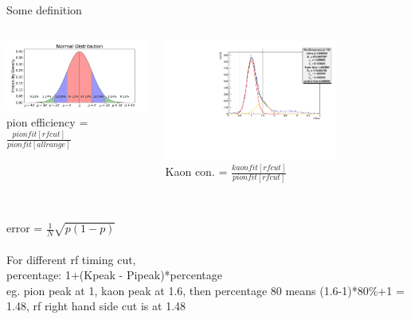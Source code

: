 \documentclass[aspectratio=169,xcolor=dvipsnames]{beamer}
\begin{document}
\begin{frame}{Some definition}
\begin{columns}
\begin{column}[T]{0.5\textwidth}
\includegraphics[width = \textwidth]{graphs/normal-distribution-curve.jpg}
\\pion efficiency = $\frac{pionfit[rfcut]}{pionfit[all range]}$

\end{column}
\begin{column}[T]{0.5\textwidth}
\includegraphics[width = 0.7\textwidth]{results/pid/rftime/rftime_pos_150_pi.pdf}
\\Kaon con. = $\frac{kaonfit[rfcut]}{pionfit[rfcut]}$
\end{column}
\end{columns}
\\error = $\frac{1}{N}  \sqrt{p(1-p)}$
\\
    \\For different rf timing cut,
    \\percentage: 1+(Kpeak - Pipeak)*percentage
  \\eg. pion peak at 1, kaon peak at 1.6, then percentage 80 means (1.6-1)*80\%+1 = 1.48, rf right hand side cut is at 1.48
\end{frame}
\end{document}
